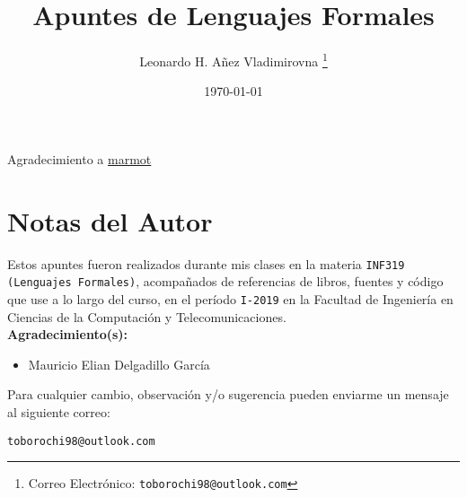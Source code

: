 

\title{Apuntes de Lenguajes Formales}

\author{Leonardo H. Añez Vladimirovna%
  \thanks{Correo Electrónico: \texttt{toborochi98@outlook.com}}}
\date{\today}

\maketitle

Agradecimiento a \href{https://tex.stackexchange.com/users/121799/marmot}{marmot}

\section*{Notas del Autor}
Estos apuntes fueron realizados durante mis clases en la materia \texttt{INF319 (Lenguajes Formales)}, acompañados de referencias de libros, fuentes y código que use a lo largo del curso, en el período \texttt{I-2019} en la Facultad de Ingeniería en Ciencias de la Computación y Telecomunicaciones. \\${ }$\\
\textbf{Agradecimiento(s):}
\begin{itemize}
\item Mauricio Elian Delgadillo García
\end{itemize}

Para cualquier cambio, observación y/o sugerencia pueden enviarme un mensaje al siguiente correo:
\begin{center}
 \texttt{toborochi98@outlook.com}
\end{center}

\tableofcontents
